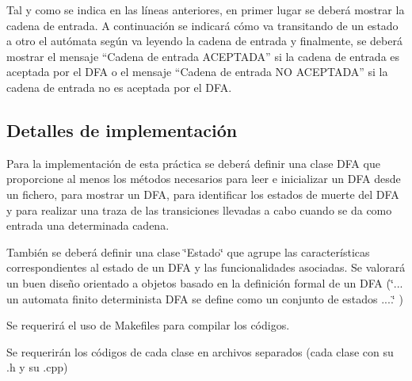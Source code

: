 Tal y como se indica en las líneas anteriores, en primer lugar se deberá mostrar la cadena de entrada. A continuación se indicará cómo va transitando de un estado a otro el autómata según va leyendo la cadena de entrada y finalmente, se deberá mostrar el mensaje “\+Cadena de entrada A\+C\+E\+P\+T\+A\+D\+A” si la cadena de entrada es aceptada por el D\+FA o el mensaje “\+Cadena de entrada NO A\+C\+E\+P\+T\+A\+D\+A” si la cadena de entrada no es aceptada por el D\+FA.

\subsection*{Detalles de implementación}


\begin{DoxyItemize}
\item Para la implementación de esta práctica se deberá definir una clase D\+FA que proporcione al menos los métodos necesarios para leer e inicializar un D\+FA desde un fichero, para mostrar un D\+FA, para identificar los estados de muerte del D\+FA y para realizar una traza de las transiciones llevadas a cabo cuando se da como entrada una determinada cadena.
\item También se deberá definir una clase \char`\"{}\+Estado\char`\"{} que agrupe las características correspondientes al estado de un D\+FA y las funcionalidades asociadas. Se valorará un buen diseño orientado a objetos basado en la definición formal de un D\+FA (\char`\"{}... un automata finito determinista D\+F\+A se define como un conjunto de estados ....\char`\"{} )
\item Se requerirá el uso de Makefiles para compilar los códigos.
\item Se requerirán los códigos de cada clase en archivos separados (cada clase con su .h y su .cpp) 
\end{DoxyItemize}
